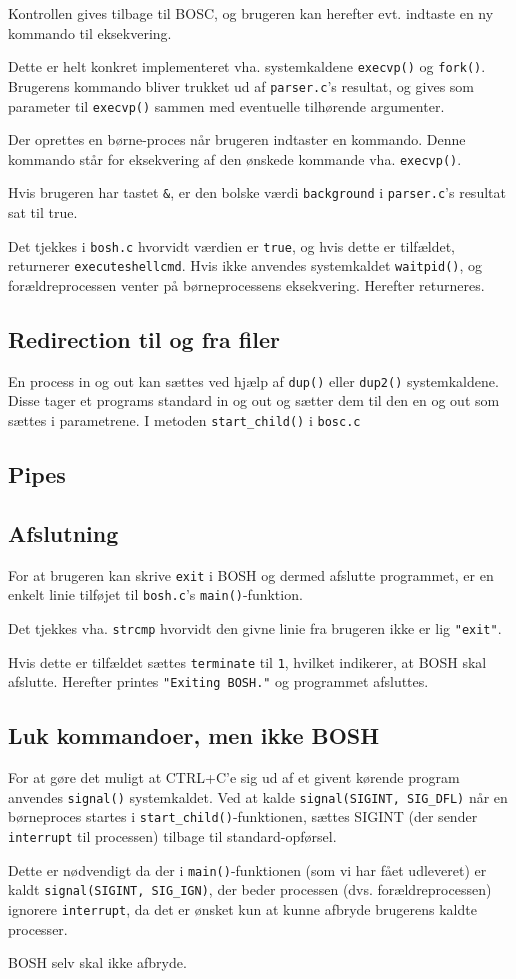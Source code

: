 Kontrollen gives tilbage til BOSC, og brugeren kan herefter evt. indtaste en ny kommando til eksekvering. 

Dette er helt konkret implementeret vha. systemkaldene \verb+execvp()+ og \verb+fork()+. Brugerens kommando bliver trukket ud af \verb+parser.c+'s resultat, og gives som parameter til \verb+execvp()+ sammen med eventuelle tilhørende argumenter. 

Der oprettes en børne-proces når brugeren indtaster en kommando. Denne kommando står for eksekvering af den ønskede kommande vha. \verb+execvp()+. 

Hvis brugeren har tastet \verb+&+, er den bolske værdi \verb+background+ i \verb+parser.c+'s resultat sat til true. 

Det tjekkes i \verb+bosh.c+ hvorvidt værdien er \verb+true+, og hvis dette er tilfældet, returnerer \verb+executeshellcmd+. Hvis ikke anvendes systemkaldet \verb+waitpid()+, og forældreprocessen venter på børneprocessens eksekvering. Herefter returneres.
\subsection{Redirection til og fra filer}
En process in og out kan sættes ved hjælp af \verb+dup()+ eller \verb+dup2()+ systemkaldene. Disse tager et programs standard in og out og sætter dem til den en og out som sættes i parametrene. I metoden \verb+start_child()+ i \verb+bosc.c+
\subsection{Pipes}
\subsection{Afslutning}
For at brugeren kan skrive \verb+exit+ i BOSH og dermed afslutte programmet, er en enkelt linie tilføjet til \verb+bosh.c+'s \verb+main()+-funktion. 

Det tjekkes vha. \verb+strcmp+ hvorvidt den givne linie fra brugeren ikke er lig \verb+"exit"+.

Hvis dette er tilfældet sættes \verb+terminate+ til \verb+1+, hvilket indikerer, at BOSH skal afslutte. Herefter printes \verb+"Exiting BOSH."+ og programmet afsluttes. 
\subsection{Luk kommandoer, men ikke BOSH}
For at gøre det muligt at CTRL+C'e sig ud af et givent kørende program anvendes \verb+signal()+ systemkaldet. Ved at kalde \verb+signal(SIGINT, SIG_DFL)+ når en børneproces startes i \verb+start_child()+-funktionen, sættes SIGINT (der sender \verb+interrupt+ til processen) tilbage til standard-opførsel.

Dette er nødvendigt da der i \verb+main()+-funktionen (som vi har fået udleveret) er kaldt \verb+signal(SIGINT, SIG_IGN)+, der beder processen (dvs. forældreprocessen) ignorere \verb+interrupt+, da det er ønsket kun at kunne afbryde brugerens kaldte processer. 

BOSH selv skal ikke afbryde.
